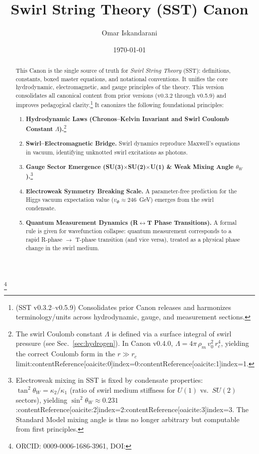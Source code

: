 \documentclass[reprint,aps,onecolumn,nofootinbib]{revtex4-2}
\begin{document}
	\title{Swirl String Theory (SST) Canon \canonversion}
	\author{Omar Iskandarani}
    \thanks{ORCID: 0009-0006-1686-3961, DOI: \paperdoi}
	\date{\today}

    \begin{abstract}
    This Canon is the single source of truth for \emph{Swirl String Theory} (SST): definitions, constants, boxed master equations, and notational conventions. It unifies the core hydrodynamic, electromagnetic, and gauge principles of the theory. This version consolidates all canonical content from prior versions (v0.3.2 through v0.5.9) and improves pedagogical clarity.\footnote{(SST v0.3.2–v0.5.9) Consolidates prior Canon releases and harmonizes terminology/units across hydrodynamic, gauge, and measurement sections.} It canonizes the following foundational principles:
    \begin{enumerate}
    \item \textbf{Hydrodynamic Laws (Chronos–Kelvin Invariant and Swirl Coulomb Constant $\Lambda$).}\footnote{The swirl Coulomb constant $\Lambda$ is defined via a surface integral of swirl pressure (see Sec.~\ref{sec:hydrogen}). In Canon v0.4.0, $\Lambda = 4\pi\,\rho_m\,v_{\!0}^2\,r_c^4$, yielding the correct Coulomb form in the $r \gg r_c$ limit:contentReference[oaicite:0]{index=0}:contentReference[oaicite:1]{index=1}.}
    \item \textbf{Swirl–Electromagnetic Bridge.} Swirl dynamics reproduce Maxwell’s equations in vacuum, identifying unknotted swirl excitations as photons.
    \item \textbf{Gauge Sector Emergence (SU(3)$\times$SU(2)$\times$U(1) \& Weak Mixing Angle $\theta_W$).}\footnote{Electroweak mixing in SST is fixed by condensate properties: $\tan^2\theta_W = \kappa_{2}/\kappa_{1}$ (ratio of swirl medium stiffness for $U(1)$ vs.~$SU(2)$ sectors), yielding $\sin^2\!\theta_W \approx 0.231$:contentReference[oaicite:2]{index=2}:contentReference[oaicite:3]{index=3}. The Standard Model mixing angle is thus no longer arbitrary but computable from first principles.}
    \item \textbf{Electroweak Symmetry Breaking Scale.} A parameter-free prediction for the Higgs vacuum expectation value ($v_\Phi \approx 246$~GeV) emerges from the swirl condensate.
    \item \textbf{Quantum Measurement Dynamics (R$\leftrightarrow$T Phase Transitions).} A formal rule is given for wavefunction collapse: quantum measurement corresponds to a rapid R-phase $\to$ T-phase transition (and vice versa), treated as a physical phase change in the swirl medium.
    \end{enumerate}
    \maketitle


\end{abstract}
\end{document}

